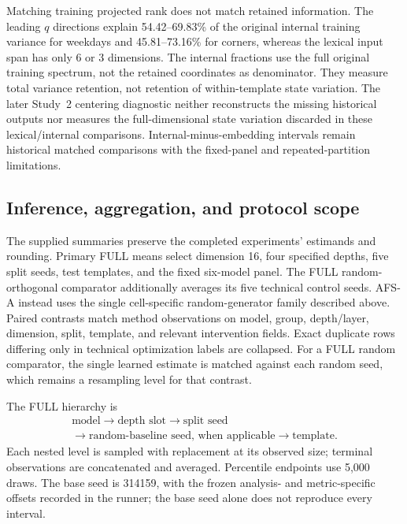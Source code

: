 Matching training projected rank does not match retained
information.
The leading $q$ directions explain 54.42--69.83\% of the
original internal training variance for weekdays and
45.81--73.16\% for corners, whereas the lexical input span
has only 6 or 3 dimensions.
The internal fractions use the full original training spectrum,
not the retained coordinates as denominator.
They measure total variance retention, not retention of
within-template state variation.
The later Study~2 centering diagnostic neither reconstructs
the missing historical outputs nor measures the full-dimensional
state variation discarded in these lexical/internal comparisons.
Internal-minus-embedding intervals remain historical matched
comparisons with the fixed-panel and repeated-partition
limitations.

\subsection{Inference, aggregation, and protocol scope}
\label{app:inference}

The supplied summaries preserve the completed experiments'
estimands and rounding.
Primary FULL means select dimension 16, four specified depths,
five split seeds, test templates, and the fixed six-model panel.
The FULL random-orthogonal comparator additionally averages
its five technical control seeds.
AFS-A instead uses the single cell-specific random-generator
family described above.
Paired contrasts match method observations on model, group,
depth/layer, dimension, split, template, and relevant
intervention fields.
Exact duplicate rows differing only in technical optimization
labels are collapsed.
For a FULL random comparator, the single learned estimate
is matched against each random seed, which remains a
resampling level for that contrast.

The FULL hierarchy is
\[
 \begin{gathered}
 \text{model}\longrightarrow\text{depth slot}
 \longrightarrow\text{split seed}
 \\
 \longrightarrow
 \text{random-baseline seed, when applicable}
 \longrightarrow\text{template}.
 \end{gathered}
\]
Each nested level is sampled with replacement at its observed
size; terminal observations are concatenated and averaged.
Percentile endpoints use 5,000 draws.
The base seed is 314159, with the frozen analysis- and
metric-specific offsets recorded in the runner;
the base seed alone does not reproduce every interval.

